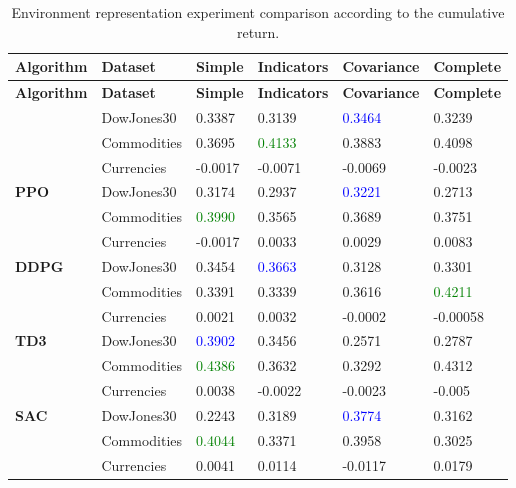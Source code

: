 \begin{longtable}{|p{2cm}|p{2.2cm}|p{2cm}|p{2cm}|p{2.2cm}|p{2cm}|}
    \hline
    \textbf{Algorithm} & \textbf{Dataset} & \textbf{Simple} & \textbf{Indicators} & \textbf{Covariance} & \textbf{Complete} \\ \midrule
    \endfirsthead

    \hline
    \textbf{Algorithm} & \textbf{Dataset} & \textbf{Simple} & \textbf{Indicators} & \textbf{Covariance} & \textbf{Complete}  \\ \midrule
    \endhead

    \caption{Environment representation experiment comparison according to the cumulative return.}
    \label{tab:experiment_environment_cumulative}

    \endfoot

    \hline  
    \multirow{3}{*}{\textbf{A2C}}
    & DowJones30 & 0.3387 & 0.3139 & \textcolor{blue}{0.3464} & 0.3239 \\ \cline{2-6}
    & Commodities & 0.3695 & \textcolor{green}{0.4133} & 0.3883 & 0.4098 \\ \cline{2-6}
    & Currencies & -0.0017 & -0.0071 & -0.0069 & -0.0023 \\ \midrule

    \multirow{3}{*}{\textbf{PPO}}
    & DowJones30 & 0.3174 & 0.2937 & \textcolor{blue}{0.3221} & 0.2713 \\ \cline{2-6}
    & Commodities & \textcolor{green}{0.3990} & 0.3565 & 0.3689 & 0.3751 \\ \cline{2-6}
    & Currencies & -0.0017 & 0.0033 & 0.0029 & 0.0083 \\ \midrule

    \multirow{3}{*}{\textbf{DDPG}}
    & DowJones30 & 0.3454 & \textcolor{blue}{0.3663} & 0.3128 & 0.3301 \\ \cline{2-6}
    & Commodities & 0.3391 & 0.3339 & 0.3616 & \textcolor{green}{0.4211} \\ \cline{2-6}
    & Currencies & 0.0021 & 0.0032 & -0.0002 & -0.00058 \\ \midrule

    \multirow{3}{*}{\textbf{TD3}}
    & DowJones30 & \textcolor{blue}{0.3902} & 0.3456 & 0.2571 & 0.2787 \\ \cline{2-6}
    & Commodities & \textcolor{green}{0.4386} & 0.3632 & 0.3292 & 0.4312 \\ \cline{2-6}
    & Currencies & 0.0038 & -0.0022 & -0.0023 & -0.005 \\ \midrule

    \multirow{3}{*}{\textbf{SAC}}
    & DowJones30 & 0.2243 & 0.3189 & \textcolor{blue}{0.3774} & 0.3162 \\ \cline{2-6}
    & Commodities & \textcolor{green}{0.4044} & 0.3371 & 0.3958 & 0.3025 \\ \cline{2-6}
    & Currencies & 0.0041 & 0.0114 & -0.0117 & 0.0179 \\ \midrule
\end{longtable}
